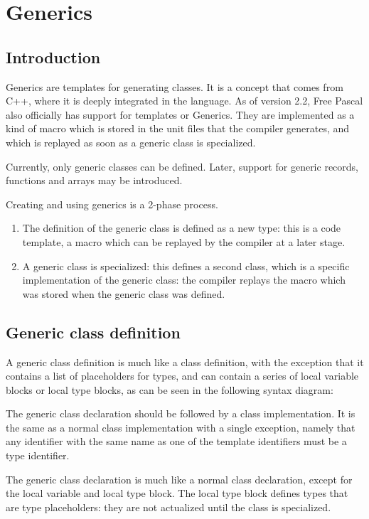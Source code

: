 \chapter{Generics}
\label{ch:generics}
\section{Introduction}
Generics are templates for generating classes. It is a concept that
comes from C++, where it is deeply integrated in the language. As of
version 2.2, Free Pascal also officially has support for templates or
Generics. They are implemented as a kind of macro which is stored in the
unit files that the compiler generates, and which is replayed as soon
as a generic class is specialized.

Currently, only generic classes can be defined. Later, support for
generic records, functions and arrays may be introduced.

Creating and using generics is a 2-phase process.
\begin{enumerate}
\item The definition of the generic class is defined as a new type: 
this is a code template, a macro which can be replayed by the compiler 
at a later stage.
\item A generic class is specialized: this defines a second class,
which is a specific implementation of the generic class: the compiler
replays the macro which was stored when the generic class was defined.
\end{enumerate}

\section{Generic class definition}
A generic class definition is much like a class definition, with the
exception that it contains a list of placeholders for types, and can 
contain a series of local variable blocks or local type blocks, as can be
seen in the following syntax diagram:

The generic class declaration should be followed by a class implementation.
It is the same as a normal class implementation with a single exception,
namely that any identifier with the same name as one of the template
identifiers must be a type identifier.

The generic class declaration is much like a normal class declaration, 
except for the local variable and local type block. The local type block
defines types that are type placeholders: they are not actualized until
the class is specialized.

